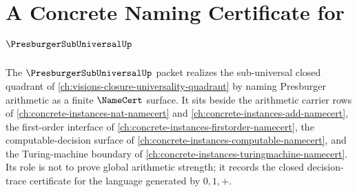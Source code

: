 \chapter{A Concrete Naming Certificate for $\PresburgerSubUniversalUp$}
\label{ch:concrete-instances-presburger-subuniversal-namecert}

The $\PresburgerSubUniversalUp$ packet realizes the sub-universal closed quadrant of \autoref{ch:visions-closure-universality-quadrant} by naming Presburger arithmetic as a finite $\NameCert$ surface. It sits beside the arithmetic carrier rows of \autoref{ch:concrete-instances-nat-namecert} and \autoref{ch:concrete-instances-add-namecert}, the first-order interface of \autoref{ch:concrete-instances-firstorder-namecert}, the computable-decision surface of \autoref{ch:concrete-instances-computable-namecert}, and the Turing-machine boundary of \autoref{ch:concrete-instances-turingmachine-namecert}. Its role is not to prove global arithmetic strength; it records the closed decision-trace certificate for the language generated by $0,1,+$.



